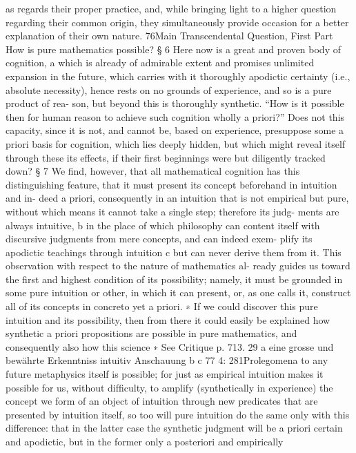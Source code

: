 as regards their proper practice, and, while bringing light to a higher
question regarding their common origin, they simultaneously provide
occasion for a better explanation of their own nature.
76Main Transcendental Question,
First Part
How is pure mathematics possible?
§ 6
Here now is a great and proven body of cognition, a which is already of
admirable extent and promises unlimited expansion in the future, which
carries with it thoroughly apodictic certainty (i.e., absolute necessity),
hence rests on no grounds of experience, and so is a pure product of rea-
son, but beyond this is thoroughly synthetic. “How is it possible then for
human reason to achieve such cognition wholly a priori?” Does not this
capacity, since it is not, and cannot be, based on experience, presuppose
some a priori basis for cognition, which lies deeply hidden, but which
might reveal itself through these its effects, if their ﬁrst beginnings were
but diligently tracked down?
§ 7
We ﬁnd, however, that all mathematical cognition has this distinguishing
feature, that it must present its concept beforehand in intuition and in-
deed a priori, consequently in an intuition that is not empirical but pure,
without which means it cannot take a single step; therefore its judg-
ments are always intuitive, b in the place of which philosophy can content
itself with discursive judgments from mere concepts, and can indeed exem-
plify its apodictic teachings through intuition c but can never derive them
from it. This observation with respect to the nature of mathematics al-
ready guides us toward the ﬁrst and highest condition of its possibility;
namely, it must be grounded in some pure intuition or other, in which it
can present, or, as one calls it, construct all of its concepts in concreto yet
a priori. ∗ If we could discover this pure intuition and its possibility, then
from there it could easily be explained how synthetic a priori propositions
are possible in pure mathematics, and consequently also how this science
∗ See Critique p. 713. 29
a eine grosse und bewährte Erkenntniss
intuitiv
Anschauung
b
c
77
4: 281Prolegomena to any future metaphysics
itself is possible; for just as empirical intuition makes it possible for us,
without difﬁculty, to amplify (synthetically in experience) the concept we
form of an object of intuition through new predicates that are presented
by intuition itself, so too will pure intuition do the same only with this
difference: that in the latter case the synthetic judgment will be a priori
certain and apodictic, but in the former only a posteriori and empirically
